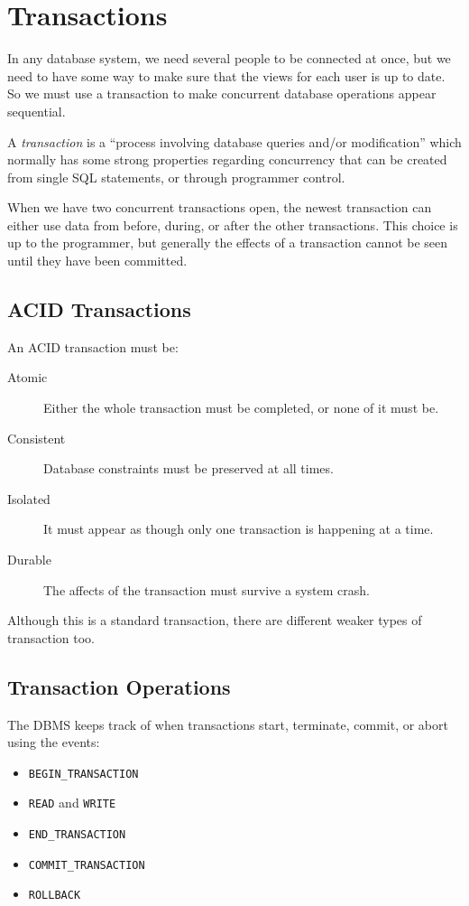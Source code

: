 \section{Transactions}\label{sec:transactions}

In any database system, we need several people to be connected at once, but we need to have some way to make sure that the views for each user is up to date.
So we must use a transaction to make concurrent database operations appear sequential.

A \emph{transaction} is a ``process involving database queries and/or modification'' which normally has some strong properties regarding concurrency that can be created from single SQL statements, or through programmer control.

When we have two concurrent transactions open, the newest transaction can either use data from before, during, or after the other transactions.
This choice is up to the programmer, but generally the effects of a transaction cannot be seen until they have been committed.

\subsection{ACID Transactions}\label{sub:acid_transactions}

An ACID transaction must be:
\begin{description}
    \item[Atomic] Either the whole transaction must be completed, or none of it must be.
    \item[Consistent] Database constraints must be preserved at all times.
    \item[Isolated] It must appear as though only one transaction is happening at a time.
    \item[Durable] The affects of the transaction must survive a system crash.
\end{description}
\begin{note}
    Although this is a standard transaction, there are different weaker types of transaction too.
\end{note}

\subsection{Transaction Operations}\label{sub:transaction_operations}

The DBMS keeps track of when transactions start, terminate, commit, or abort using the events:
\begin{itemize}
    \item \texttt{BEGIN_TRANSACTION}
    \item \texttt{READ} and \texttt{WRITE}
    \item \texttt{END_TRANSACTION}
    \item \texttt{COMMIT_TRANSACTION}
    \item \texttt{ROLLBACK}
\end{itemize}

